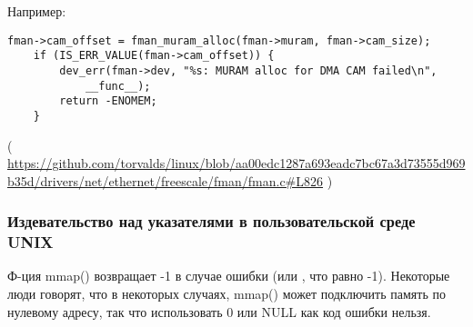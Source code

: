 Например:

\begin{lstlisting}[style=customc]
	fman->cam_offset = fman_muram_alloc(fman->muram, fman->cam_size);
	if (IS_ERR_VALUE(fman->cam_offset)) {
		dev_err(fman->dev, "%s: MURAM alloc for DMA CAM failed\n",
			__func__);
		return -ENOMEM;
	}
\end{lstlisting}

( \url{https://github.com/torvalds/linux/blob/aa00edc1287a693eadc7bc67a3d73555d969b35d/drivers/net/ethernet/freescale/fman/fman.c#L826} )

\subsubsection{Издевательство над указателями в пользовательской среде UNIX}

Ф-ция mmap() возвращает -1 в случае ошибки (или , что равно -1).
Некоторые люди говорят, что в некоторых случаях, mmap() может подключить память по нулевому адресу, так что использовать
0 или NULL как код ошибки нельзя.

